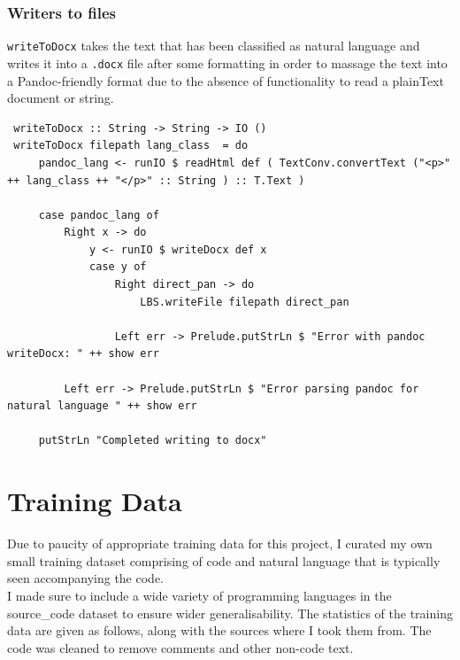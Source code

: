 \documentclass[12pt]{scrreprt}
\begin{document}
\subsubsection{Writers to files}
\texttt{writeToDocx} takes the text that has been classified as natural language and writes it into a \texttt{.docx} file after some formatting in order to massage the text into a Pandoc-friendly format due to the absence of functionality to read a plainText document or string.

\begin{verbatim}
 writeToDocx :: String -> String -> IO ()
 writeToDocx filepath lang_class  = do
     pandoc_lang <- runIO $ readHtml def ( TextConv.convertText ("<p>" ++ lang_class ++ "</p>" :: String ) :: T.Text )
 
     case pandoc_lang of
         Right x -> do
             y <- runIO $ writeDocx def x
             case y of
                 Right direct_pan -> do
                     LBS.writeFile filepath direct_pan
 
                 Left err -> Prelude.putStrLn $ "Error with pandoc writeDocx: " ++ show err
 
         Left err -> Prelude.putStrLn $ "Error parsing pandoc for natural language " ++ show err
 
     putStrLn "Completed writing to docx"
\end{verbatim}


\newpage 
\section{Training Data}

Due to paucity of appropriate training data for this project, I curated my own small training dataset comprising of code and natural language that is typically seen accompanying the code. \\ I made sure to include a wide variety of programming languages in the source_code dataset to ensure wider generalisability. The statistics of the training data are given as follows, along with the sources where I took them from. The code was cleaned to remove comments and other non-code text.


\end{document}
